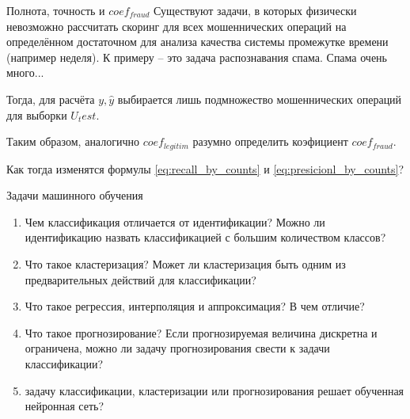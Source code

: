 \documentclass{beamer}
\begin{document}
  	\begin{frame}{Полнота, точность и $coef_{fraud}$}
  		Существуют задачи, в которых физически невозможно рассчитать скоринг для всех 
  		мошеннических операций на определённом достаточном для анализа качества системы промежутке времени (например неделя).
  		К примеру -- это задача распознавания спама. Спама очень много...
  		
  		Тогда, для расчёта ${y, \hat y}$ выбирается лишь подмножество мошеннических операций для выборки $U_test$.
  		
  		Таким образом, аналогично $coef_{legitim}$ разумно определить коэфициент $coef_{fraud}$.
  		
  		Как тогда изменятся формулы \eqref{eq:recall_by_counts} и \eqref{eq:presicionl_by_counts}?
  		
  	\end{frame}
  
  	\begin{frame}{Задачи машинного обучения}
	\begin{enumerate}
		\item Чем классификация отличается от идентификации? Можно ли идентификацию назвать классификацией с большим количеством классов?
		\item Что такое кластеризация? Может ли кластеризация быть одним из предварительных действий для классификации? 
		\item Что такое регрессия, интерполяция и аппроксимация? В чем отличие?
		\item Что такое прогнозирование? Если прогнозируемая величина дискретна и ограничена, можно ли задачу прогнозирования свести к задачи классификации?
		\item задачу классификации, кластеризации или прогнозирования решает обученная нейронная сеть?	
	\end{enumerate}  	  	
	
	\end{frame}
  
\end{document}
